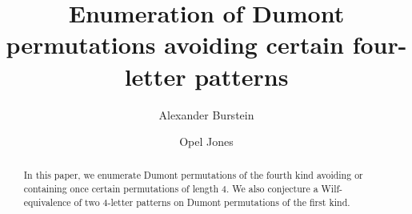 \documentclass[
final
]{dmtcs-episciences}
\author{Alexander Burstein\affiliationmark{1}
  \and Opel Jones\affiliationmark{2} 
  }
\title{Enumeration of Dumont permutations avoiding certain four-letter patterns}
\affiliation{
  Department of Mathematics, Howard University, Washington, DC 20059, USA\\
  Department of Mathematics, Towson University, Towson, MD 21252, USA
  }
\theoremstyle{definition}
\theoremstyle{remark}
\begin{document}
\maketitle


\begin{abstract}
In this paper, we enumerate Dumont permutations of the fourth kind avoiding or containing once certain permutations of length 4. We also conjecture a Wilf-equivalence of two 4-letter patterns on Dumont permutations of the first kind.
\end{abstract}

%
%
%
%
%
\end{document}
